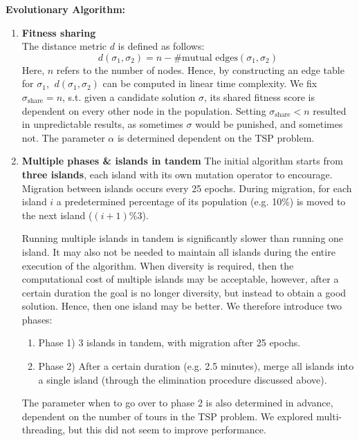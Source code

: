 \documentclass[a4paper,10pt]{article}
\begin{document}
	\textbf{Evolutionary Algorithm:}
	\begin{enumerate}
		\item \textbf{Fitness sharing} \\
		The distance metric $d$ is defined as follows: 
		$$d(\sigma_1, \sigma_2) = n - \# \text{mutual edges}(\sigma_1, \sigma_2)$$
		Here, $n$ refers to the number of nodes. Hence, by constructing an edge table for $\sigma_1$, $~d(\sigma_1, \sigma_2)$ can be computed in linear time complexity.
		We fix $\sigma_{\text{share}} = n$, s.t. given a candidate solution $\sigma$, its shared fitness score is dependent on every other node in the population. Setting $\sigma_{\text{share}} < n$ resulted in unpredictable results, as sometimes $\sigma$ would be punished, and sometimes not. The parameter $\alpha$ is determined dependent on the TSP problem.
		
		\item \textbf{Multiple phases \& islands in tandem}
		The initial algorithm starts from \textbf{three islands}, each island with its own mutation operator to encourage. Migration between islands occurs every 25 epochs. During migration, for each island $i$ a predetermined percentage of its population (e.g. 10\%) is moved to the next island ($(i+1) \%3$).
		
		Running multiple islands in tandem is significantly slower than running one island. It may also not be needed to maintain all islands during the entire execution of the algorithm. When diversity is required, then the computational cost of multiple islands may be acceptable, however, after a certain duration the goal is no longer diversity, but instead to obtain a good solution. Hence, then one island may be better. We therefore introduce two phases:
		\begin{enumerate}
			\item Phase 1) 3 islands in tandem, with migration after 25 epochs.
			\item Phase 2) After a certain duration (e.g. 2.5 minutes), merge all islands into a single island (through the elimination procedure discussed above).
		\end{enumerate}
		
		The parameter when to go over to phase 2 is also determined in advance, dependent on the number of tours in the TSP problem.  We explored multi-threading, but this did not seem to improve performance.
		 	
	
	\end{enumerate}
	
\end{document}

